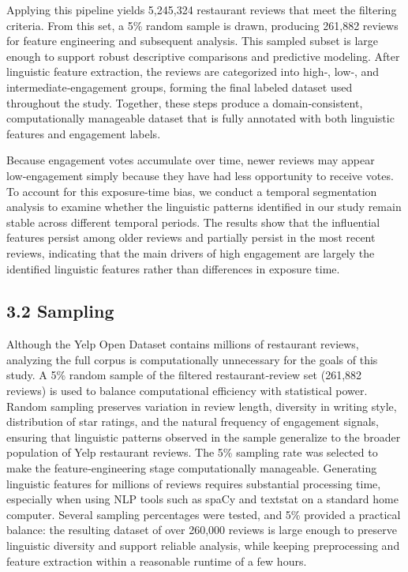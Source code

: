 Applying this pipeline yields 5,245,324 restaurant reviews that meet the
filtering criteria. From this set, a 5\% random sample is drawn,
producing 261,882 reviews for feature engineering and subsequent
analysis. This sampled subset is large enough to support robust
descriptive comparisons and predictive modeling. After linguistic
feature extraction, the reviews are categorized into high‑, low‑, and
intermediate‑engagement groups, forming the final labeled dataset used
throughout the study. Together, these steps produce a domain‑consistent,
computationally manageable dataset that is fully annotated with both
linguistic features and engagement labels.

Because engagement votes accumulate over time, newer reviews may appear
low‑engagement simply because they have had less opportunity to receive
votes. To account for this exposure‑time bias, we conduct a temporal
segmentation analysis to examine whether the linguistic patterns
identified in our study remain stable across different temporal periods.
The results show that the influential features persist among older
reviews and partially persist in the most recent reviews, indicating
that the main drivers of high engagement are largely the identified
linguistic features rather than differences in exposure time.

\hypertarget{sampling}{%
\subsection{3.2 Sampling}\label{sampling}}

Although the Yelp Open Dataset contains millions of restaurant reviews,
analyzing the full corpus is computationally unnecessary for the goals
of this study. A 5\% random sample of the filtered restaurant‑review set
(261,882 reviews) is used to balance computational efficiency with
statistical power. Random sampling preserves variation in review length,
diversity in writing style, distribution of star ratings, and the
natural frequency of engagement signals, ensuring that linguistic
patterns observed in the sample generalize to the broader population of
Yelp restaurant reviews. The 5\% sampling rate was selected to make the
feature‑engineering stage computationally manageable. Generating
linguistic features for millions of reviews requires substantial
processing time, especially when using NLP tools such as spaCy and
textstat on a standard home computer. Several sampling percentages were
tested, and 5\% provided a practical balance: the resulting dataset of
over 260,000 reviews is large enough to preserve linguistic diversity
and support reliable analysis, while keeping preprocessing and feature
extraction within a reasonable runtime of a few hours.

